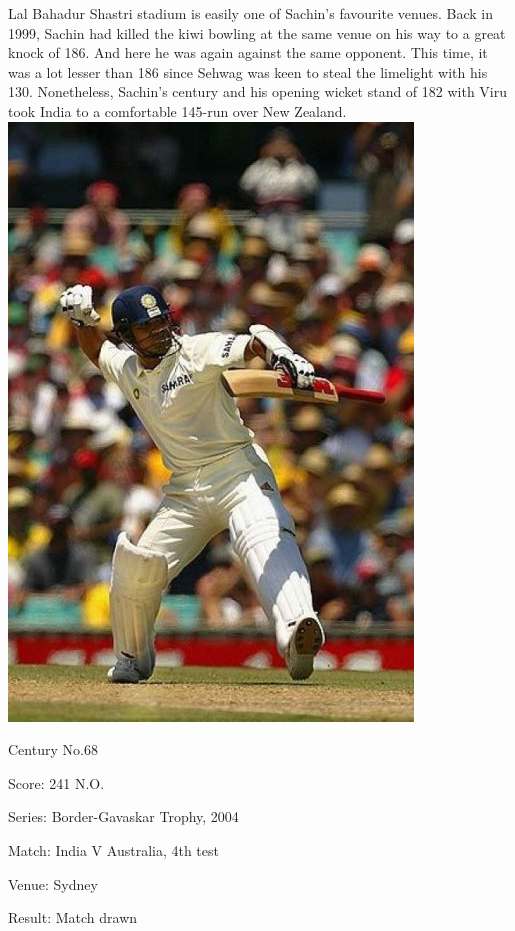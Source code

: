 \documentclass[11pt, a4paper]{article}
\begin{document}
Lal Bahadur Shastri stadium is easily one of Sachin's favourite venues. Back in 1999, Sachin had killed the kiwi bowling at the same venue on his way to a great knock of 186. And here he was again against the same opponent. This time, it was a lot lesser than 186 since Sehwag was keen to steal the limelight with his 130. Nonetheless, Sachin's century and his opening wicket stand of 182 with Viru took India to a comfortable 145-run over New Zealand.
\newpage
\includegraphics[height=0.75\textheight]{pics/68.jpg}

Century No.68 

Score: 241 N.O. 

Series: Border-Gavaskar Trophy, 2004 

Match: India V Australia, 4th test 

Venue: Sydney 

Result: Match drawn 
\end{document}
